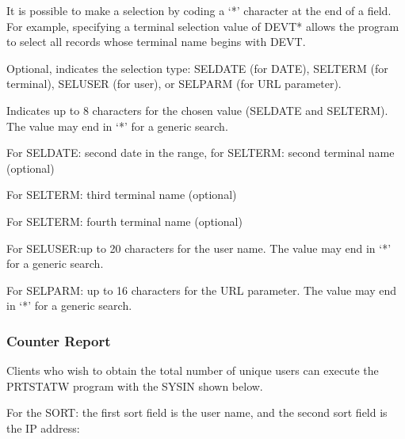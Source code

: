 \documentclass[letterpaper,10pt,english]{sphinxmanual}
\begin{document}
\sphinxAtStartPar
It is possible to make a  selection by coding a ‘*’ character at the end of a field. For example, specifying a terminal selection value of DEVT* allows the program to select all records whose terminal name begins with DEVT.
\begin{description}
\sphinxAtStartPar
Optional, indicates the selection type: SELDATE (for DATE), SELTERM (for terminal), SELUSER (for user), or SELPARM (for URL parameter).

\sphinxAtStartPar
Indicates up to 8 characters for the chosen value (SELDATE and SELTERM). The value may end in ‘*’ for a generic search.

\sphinxAtStartPar
For SELDATE: second date in the range, for SELTERM: second terminal name (optional)

\sphinxAtStartPar
For SELTERM: third terminal name (optional)

\sphinxAtStartPar
For SELTERM: fourth terminal name (optional)

\sphinxAtStartPar
For SELUSER:up to 20 characters for the user name. The value may end in ‘*’ for a generic search.

\sphinxAtStartPar
For SELPARM: up to 16 characters for the URL parameter. The value  may end in ‘*’ for a generic search.

\end{description}


\subsubsection{Counter Report}
\label{\detokenize{audit_operations_ and_performance:counter-report}}
\sphinxAtStartPar
Clients who wish to obtain the total number of unique users can execute the PRTSTATW program with the SYSIN shown below.

\sphinxAtStartPar
For the SORT: the first sort field is the user name, and the second sort field is the IP address:

\begin{sphinxVerbatim}[commandchars=\\\{\}]
  
 
\end{sphinxVerbatim}
\end{document}
